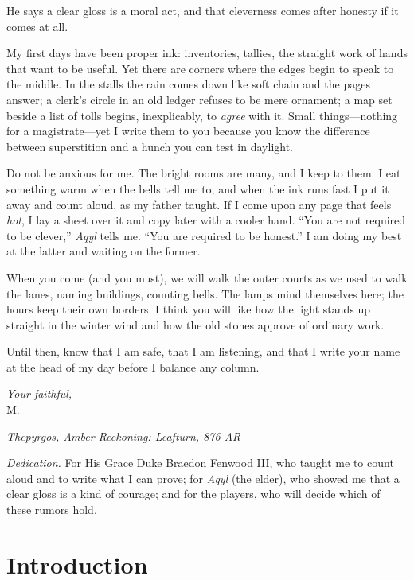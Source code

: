 \documentclass[11pt]{article}
\numberwithin{equation}{section} %
\theoremstyle{plain} %
\theoremstyle{definition} %
\theoremstyle{remark} %
\begin{document}
He says a clear gloss is a moral act, and that cleverness comes after honesty if it comes at all.

\medskip
My first days have been proper ink: inventories, tallies, the straight work of hands that want to be useful. Yet there are corners where the edges begin to speak to the middle. In the stalls the rain comes down like soft chain and the pages answer; a clerk’s circle in an old ledger refuses to be mere ornament; a map set beside a list of tolls begins, inexplicably, to \emph{agree} with it. Small things—nothing for a magistrate—yet I write them to you because you know the difference between superstition and a hunch you can test in daylight.

Do not be anxious for me. The bright rooms are many, and I keep to them. I eat something warm when the bells tell me to, and when the ink runs fast I put it away and count aloud, as my father taught. If I come upon any page that feels \emph{hot}, I lay a sheet over it and copy later with a cooler hand. “You are not required to be clever,” \textit{Aqyl} tells me. “You are required to be honest.” I am doing my best at the latter and waiting on the former.

\medskip
When you come (and you must), we will walk the outer courts as we used to walk the lanes, naming buildings, counting bells. The lamps mind themselves here; the hours keep their own borders. I think you will like how the light stands up straight in the winter wind and how the old stones approve of ordinary work.

Until then, know that I am safe, that I am listening, and that I write your name at the head of my day before I balance any column.

\medskip
\noindent\textit{Your faithful,}\\
M.

\begin{flushright}
\textit{Thepyrgos, Amber Reckoning: Leafturn, 876 AR}
\end{flushright}

\medskip
\noindent\textit{Dedication.} For His Grace Duke Braedon Fenwood III, who taught me to count aloud and to write what I can prove; for \textit{Aqyl} (the elder), who showed me that a clear gloss is a kind of courage; and for the players, who will decide which of these rumors hold.

\clearpage

\section{Introduction}
\label{sec:introduction}
\end{document}
